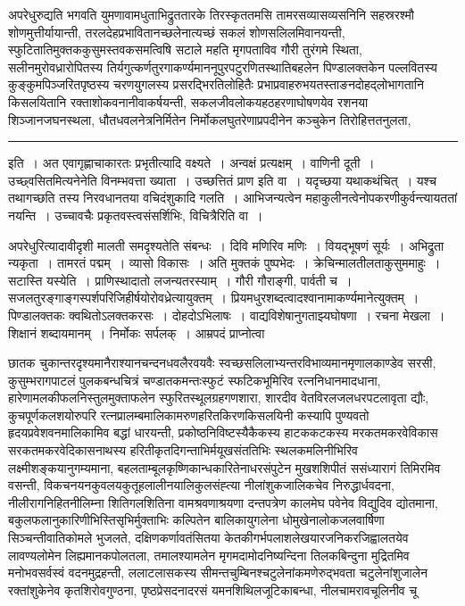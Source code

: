 \documentclass[11pt, openany]{book}
\begin{document}
अपरेधुरुद्यति भगवति युमणावामधुताभिद्रुततारके तिरस्कृततमसि तामरसव्यासव्यसनिनि सहस्ररश्मौ शोणमुत्तीर्यायान्ती, तरलदेहप्रभावितानच्छलेनात्यच्छं सकलं शोणसलिलमिवानयन्ती, स्फुटितातिमुक्तककुसुमस्तवकसमत्विषि सटाले महति मृगपताविव गौरी तुरंगमे स्थिता, सलीनमुरोवध्रारोपितस्य तिर्यगुत्कर्णतुरगाकर्ण्यमाननूपुरपटुरणितस्थातिबहलेन पिण्डालक्तकेन पल्लवितस्य कुङ्कुमपिञ्जरितपृष्ठस्य चरणयुगलस्य प्रसरद्भिरतिलोहितैः प्रभाप्रवाहरुभयतस्ताङनदोहद्लोभागतानि किसलयितानि रक्ताशोकवनानीवाकर्षयन्ती, सकलजीवलोकयहठहरणाघोषणयेव रशनया शिञ्जानजघनस्थला, धौतधवलनेत्रनिर्मितेन निर्मोकलघुतरेणाप्रपदीनेन कञ्चुकेन तिरोहित्ततनुलता,

\vspace{2mm}
\hrule

\noindent
{\s इति~। अत एवागृह्णाचाकारतः प्रभृतीत्यादि वक्ष्यते~। अन्वक्षं प्रत्यक्षम्~। वाणिनी दूती~। उच्छ्वसितमित्यनेनेति विनम्भवत्ता ख्याता~। उच्छत्तितं प्राण इति वा~। यदृच्छया यथाकथंचित्~। यश्च तथागच्छति तस्य निरवधानतया वचिदंशुकादि गलति~। आभिजन्यत्वेन महाकुलीनत्वेनोपकरणीकुर्वन्त्यायततां नयन्ति~। उच्चावचैः प्रकृतवस्त्वसंसर्शिभिः, विचित्रैरिति वा~।

अपरेधुरित्यादावीदृशी मालती समदृश्यतेति संबन्धः~। दिवि मणिरिव मणिः~। वियद्भूषणं सूर्यः~। अभिद्रुता न्यकृता~। तामरतं पद्मम्~। व्यासो विकासः~। अति मुक्तकं पुष्पभेदः~। क्रेचिन्मालतीलताकुसुममाहुः~। सटास्ति यस्येति~। {\qt प्राणिस्थादातो लजन्यतरस्याम्}~। गौरी गौराङ्गी, पार्वती च~। सजलतुरङ्गाङ्गस्पर्शपरिजिहीर्षयोरोवध्रेत्यायुक्तम्~। प्रियमधुरशब्दत्वादश्वानामाकर्ण्यमानेत्युक्तम्~। पिण्डालक्तकः क्वथितोऽलक्तकरसः~। दोहदोऽभिलाषः~। वाद्यविशेषानुगताझ्यघोषणा~। रचना मेखला~। शिक्षानं शब्दायमानम्~। निर्मोकः सर्पलक्~। आम्रपदं प्राप्नोत्वा\textendash}

\newpage

\noindent
छातक चुकान्तरदृश्यमानैराश्यानचन्दनधवलैरवयवैः स्वच्छसलिलाभ्यन्तरविभाव्यमानमृणालकाण्डेव सरसी, कुसुम्भरागपाटलं पुलकबन्धचित्रं चण्डातकमन्तःस्फुटं स्फटिकभूमिरिव रत्ननिधानमादधाना, हारेणामलकीफलनिस्तुलमुक्ताफलेन स्फुरितस्थूलग्रहगणशारा, शारदीव वेतविरलजलधरपटलावृता द्यौः, कुचपूर्णकलशयोरुपरि रत्नप्रालम्बमालिकामरुणहरितकिरणकिसलयिनी कस्यापि पुण्यवतो हृदयप्रवेशवनमालिकामिव बद्धां धारयन्ती, प्रकोष्ठनिविष्टस्यैकैकस्य हाटककटकस्य मरकतमकरवेविकास सरकतमकरवेदिकासनाथस्य हरितीकृतदिगन्ताभिर्मयूखसंततिभिः स्थलकमलिनीभिरिव लक्ष्मीशङ्कयानुगम्यमाना, बहलताम्बूलकृष्णिकान्धकारितेनाधरसंपुटेन मुखशशिपीतं ससंध्यारागं तिमिरमिव वसन्ती, विकचनयनकुवलयकुतूहलालीनयालिकुलसंह्त्या नीलांशुकजालिकचेव निरुद्धार्धवदना, नीलीरागनिहितनीलिम्ना शितिगलशितिना वामश्रवणाश्रयणा दन्तपत्रेण कालमेघ पवेनेव विद्युदिव द्योतमाना, बकुलफलानुकारिणीभिस्तिसृभिर्मुक्ताभिः कल्पितेन बालिकायुगलेना धोमुखेनालोकजलवार्षिणा सिञ्चन्तीवातिकोमले भुजलते, दक्षिणकर्णावतंसितया केतकीगर्भपलाशलेखयारजनिकरजिह्वालतयेव लावण्यलोमेन लिह्यमानकपोलतला, तमालश्यामलेन मृगमदामोदनिष्यन्दिना तिलकबिन्दुना मुद्रितमिव मनोभवसर्वस्वं वदनमुद्रहन्ती, ललाटलासकस्य सीमन्तचुम्बिनश्चटुलेनांकमणेरुद्भवता चटुलेनांशुजालेन रक्तांशुकेनेव कृतशिरोवगुण्ठना, पृष्ठप्रेसदनादरसं यमनशिथिलजूटिकाबन्धा, नीलचामरावचूलिनीव चू\textendash
\end{document}
